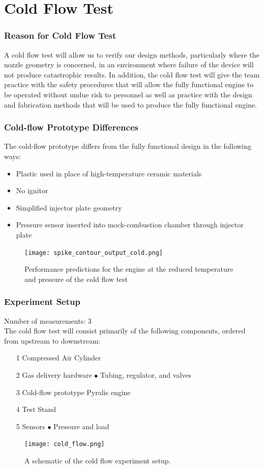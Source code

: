 \documentclass{article}
\begin{document}
\part*{Cold Flow Test}
\section*{Reason for Cold Flow Test}
A cold flow test will allow us to verify our design methods, particularly where the nozzle geometry is concerned, in an environment where failure of the device will not produce catastrophic results. In addition, the cold flow test will give the team practice with the safety procedures that will allow the fully functional engine to be operated without undue risk to personnel as well as practice with the design and fabrication methods that will be used to produce the fully functional engine.
\section*{Cold-flow Prototype Differences}
The cold-flow prototype differs from the fully functional design in the following ways:
\begin{itemize}
\item Plastic used in place of high-temperature ceramic materials
\item No ignitor
\item Simplified injector plate geometry
\item Pressure sensor inserted into mock-combustion chamber through injector plate
\end{itemize}
\begin{figure}[h!]
\centering
\texttt{[image: spike\_contour\_output\_cold.png]}
\caption{Performance predictions for the engine at the reduced temperature and pressure of the cold flow test}
\label{spike_contour_cold}
\end{figure}

\section*{Experiment Setup}
Number of measurements: 3\\

The cold flow test will consist primarily of the following components, ordered from upstream to downstream:

\begin{itemize}
\item[1]Compressed Air Cylinder
\item[2]Gas delivery hardware
\subitem $\bullet$ Tubing, regulator, and valves
\item[3]Cold-flow prototype Pyralis engine
\item[4]Test Stand
\item[5]Sensors
\subitem$\bullet$ Pressure and load
\end{itemize}
\begin{figure}[h!]
\centering
\texttt{[image: cold\_flow.png]}
\caption{A schematic of the cold flow experiment setup.} 
\label{cold_flow}
\end{figure}
\end{document}
